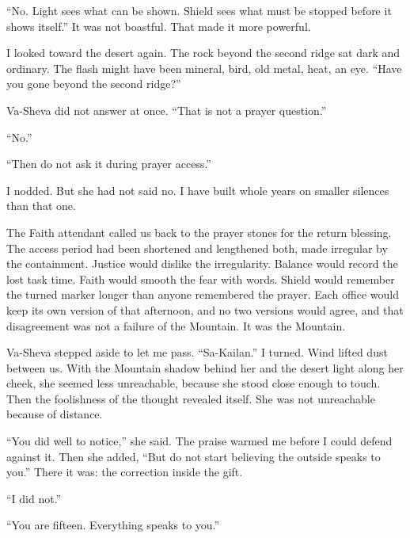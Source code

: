 ``No. Light sees what can be shown. Shield sees what must be stopped before it shows itself.'' It was not boastful. That made it more powerful.\par

I looked toward the desert again. The rock beyond the second ridge sat dark and ordinary. The flash might have been mineral, bird, old metal, heat, an eye. ``Have you gone beyond the second ridge?''\par

Va-Sheva did not answer at once. ``That is not a prayer question.''\par

``No.''\par

``Then do not ask it during prayer access.''\par

I nodded. But she had not said no. I have built whole years on smaller silences than that one.\par

\ornament

\noindent The Faith attendant called us back to the prayer stones for the return blessing. The access period had been shortened and lengthened both, made irregular by the containment. Justice would dislike the irregularity. Balance would record the lost task time. Faith would smooth the fear with words. Shield would remember the turned marker longer than anyone remembered the prayer. Each office would keep its own version of that afternoon, and no two versions would agree, and that disagreement was not a failure of the Mountain. It was the Mountain.\par

Va-Sheva stepped aside to let me pass. ``Sa-Kailan.'' I turned. Wind lifted dust between us. With the Mountain shadow behind her and the desert light along her cheek, she seemed less unreachable, because she stood close enough to touch. Then the foolishness of the thought revealed itself. She was not unreachable because of distance.\par

``You did well to notice,'' she said. The praise warmed me before I could defend against it. Then she added, ``But do not start believing the outside speaks to you.'' There it was: the correction inside the gift.\par

``I did not.''\par

``You are fifteen. Everything speaks to you.''\par

